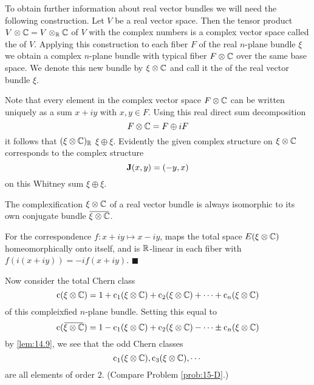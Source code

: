 \documentclass[../main]{subfiles}
\begin{document}
To obtain further information about real vector bundles we will need the following construction. Let $V$ be a real vector space. Then the tensor product $V \otimes \mathbb C = V \otimes_{\mathbb R} \mathbb C$ of $V$ with the complex numbers is a complex vector space called the  of $V$. Applying this construction to each fiber $F$ of the  real $n$-plane bundle $\xi$ we obtain a complex $n$-plane bundle with typical fiber $F  \otimes \mathbb C$ over the same base space. We denote this new bundle by $\xi \otimes \mathbb C$ and call it the  of the real vector bundle $\xi$.

Note that every element in the complex vector space $F \otimes \mathbb C$ can be written uniquely as a sum $x + iy$ with $x,y \in F$. Using this real direct sum decomposition \[F \otimes \mathbb C = F \oplus iF \] it follows that  $(\xi \otimes \mathbb C)_\mathbb R$  $\xi \oplus \xi$. Evidently the given complex structure on $\xi \otimes \mathbb C$ corresponds to the complex structure \[\mathbf{J}(x,y) = (-y,x) \] on this Whitney sum $\xi \oplus \xi$.

\begin{lemma}
\label{lem:15.01}
The complexification $\xi \otimes \mathbb C$ of a real vector bundle is always isomorphic to its own conjugate bundle $\xoverline{\xi \otimes \bC}$. 
\end{lemma}

For the correspondence $f:x + iy \mapsto x -iy$, maps the total space $E(\xi \otimes \mathbb C)$ homeomorphically onto itself, and is $\mathbb R$-linear in each fiber with \newline$f(i(x+iy)) = -if(x+iy)$. \ensuremath{\blacksquare}

Now consider the total Chern class \[\operatorname{c}(\xi \otimes \mathbb C) = 1 + \operatorname{c}_1(\xi \otimes \mathbb C) + \operatorname{c}_2(\xi \otimes \mathbb C) + \cdots + \operatorname{c}_n(\xi \otimes \mathbb C)\] of this compleixfied $n$-plane bundle. Setting this equal to \[\chernclass(\xoverline{\xi \otimes \bC}) = 1-\chernclass_1(\xi \otimes \bC) + \chernclass_2(\xi \otimes \bC) - \cdots \pm \chernclass_n(\xi \otimes \bC)\] by \ref{lem:14.9}, we see that the odd Chern classes \[\operatorname{c}_1(\xi \otimes \mathbb C), \operatorname{c}_3(\xi \otimes \mathbb C), \cdots \] are all elements of order $2$. (Compare Problem \ref{prob:15-D}.)
\end{document}
